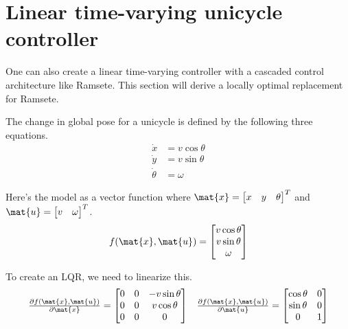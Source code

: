 \section{Linear time-varying unicycle controller}

One can also create a linear time-varying controller with a cascaded control
architecture like Ramsete. This section will derive a locally optimal
replacement for Ramsete.

The change in global pose for a unicycle is defined by the following three
equations.
\begin{align*}
  \dot{x} &= v\cos\theta \\
  \dot{y} &= v\sin\theta \\
  \dot{\theta} &= \omega
\end{align*}

Here's the model as a vector function where
$\mat{x} = \begin{bmatrix} x & y & \theta \end{bmatrix}^T$ and
$\mat{u} = \begin{bmatrix} v & \omega \end{bmatrix}^T$.
\begin{equation}
  f(\mat{x}, \mat{u}) =
  \begin{bmatrix}
    v\cos\theta \\
    v\sin\theta \\
    \omega
  \end{bmatrix}
\end{equation}

To create an LQR, we need to linearize this.
\begin{equation*}
  \begin{array}{ll}
    \frac{\partial f(\mat{x}, \mat{u})}{\partial\mat{x}} =
    \begin{bmatrix}
      0 & 0 & -v\sin\theta \\
      0 & 0 & v\cos\theta \\
      0 & 0 & 0
    \end{bmatrix} &
    \frac{\partial f(\mat{x}, \mat{u})}{\partial\mat{u}} =
    \begin{bmatrix}
      \cos\theta & 0 \\
      \sin\theta & 0 \\
      0 & 1
    \end{bmatrix}
  \end{array}
\end{equation*}

